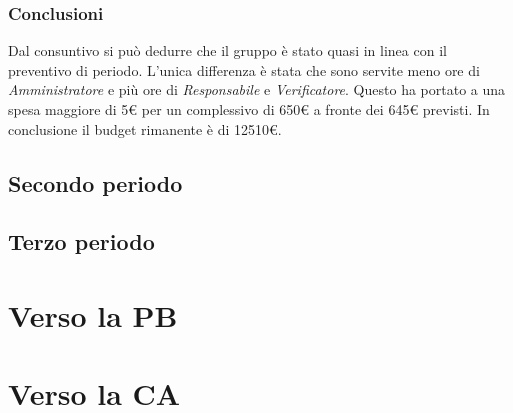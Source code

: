 \subsubsection{Conclusioni}
Dal consuntivo si può dedurre che il gruppo è stato quasi in linea con il preventivo di periodo.
L'unica differenza è stata che sono servite meno ore di \textit{Amministratore} e più
ore di \textit{Responsabile} e \textit{Verificatore}. Questo ha portato a una spesa maggiore di 5€ per un
complessivo di 650€ a fronte dei 645€ previsti.
In conclusione il budget rimanente è di 12510€.



\subsection{Secondo periodo}

\subsection{Terzo periodo}

\section{Verso la PB}

\section{Verso la CA}